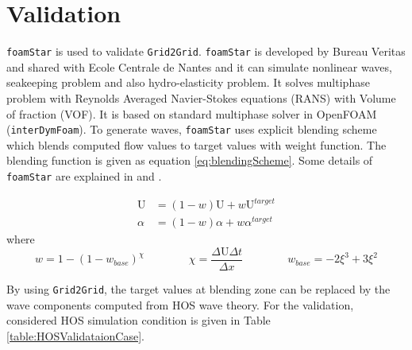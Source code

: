 \pagebreak
	\section{Validation}
	
	\texttt{foamStar} is used to validate \texttt{Grid2Grid}. \texttt{foamStar} is developed by Bureau Veritas and shared with Ecole Centrale de Nantes and it can simulate nonlinear waves, seakeeping problem and also hydro-elasticity problem. It solves multiphase problem with Reynolds Averaged Navier-Stokes equations (RANS) with Volume of fraction (VOF). It is based on standard multiphase solver in OpenFOAM (\texttt{interDymFoam}). To generate waves, \texttt{foamStar} uses explicit blending scheme which blends computed flow values to target values with weight function. The blending function is given as equation \eqref{eq:blendingScheme}. Some details of \texttt{foamStar} are explained in \cite{sopheakThesis} and \cite{Charles2017}.
	
	{
		\begin{subequations}
			\label{eq:blendingScheme}
			\begin{align}		
				\text{U} 	 &= (1-w)\text{U}  + w\text{U}^{target} \\
				\alpha 		&= (1-w)\alpha + w\alpha^{target}
			\end{align}
		\end{subequations}
		\centering
		where            
		\begin{equation*}
		w = 1 - (1-w_{base})^{\chi} \qquad  \qquad \chi = \dfrac{\Delta \text{U} \Delta t}{\Delta x} \qquad \qquad  w_{base} = -2\xi^3 + 3\xi^2
		\end{equation*} 
	}

	By using \texttt{Grid2Grid}, the target values at blending zone can be replaced by the wave components computed from HOS wave theory. For the validation, considered HOS simulation condition is given in Table \ref{table:HOSValidataionCase}.
	
